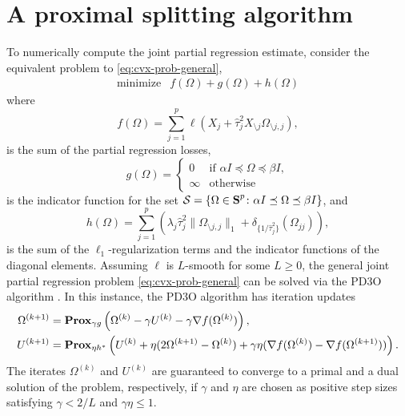 \documentclass{article}
\begin{document}
\section{A proximal splitting algorithm}\label{sec:algorithm}

To numerically compute the joint partial regression estimate, consider the
equivalent problem to \eqref{eq:cvx-prob-general}, 
\[
    \begin{array}{ll}
        \text{minimize} & \displaystyle f(\Omega) + g(\Omega) + h(\Omega)
    \end{array}
\]
where
\[
    f(\Omega) = \sum_{j=1}^{p} \ell(X_j + \hat\tau_j^2X_{\setminus j} \Omega_{\setminus j , j}),
\]
is the sum of the partial regression losses,
\[
    g(\Omega) = \begin{cases}
        0 & \text{if } \alpha I \preceq \Omega \preceq \beta I, \\
        \infty & \text{otherwise}
    \end{cases}
\]
is the indicator function for the set $\mathcal{S} = \{\Omega \in \mbox{\bf S}^p \colon
\alpha I \preceq \Omega \preceq \beta I \}$, and
\[ 
    h(\Omega) = \sum_{j=1}^{p} \left(\lambda_j \hat\tau_j^2 \|\Omega_{\setminus j, j}\|_1 + \delta_{\{1/\hat\tau_j^2\}}(\Omega_{jj}) \right), %
\]
is the sum of the $\ell_1$-regularization terms and the indicator functions of
the diagonal elements. Assuming $\ell$ is $L$-smooth for some $L\geq 0$, the
general joint partial regression problem \eqref{eq:cvx-prob-general} can be
solved via the PD3O algorithm \citep{Yan18}. In this instance, the PD3O
algorithm has iteration updates 
\[
    \begin{aligned}
        \Omega^{(k+1)} &= \mathbf{Prox}_{\gamma g}\left(\Omega^{(k)} - \gamma U^{(k)} - \gamma \nabla f(\Omega^{(k)}) \right), \\
            U^{(k+1)} &= \mathbf{Prox}_{\eta h^*}\left(U^{(k)} + \eta (2 \Omega^{(k+1)} - \Omega^{(k)}) + \gamma \eta (\nabla f(\Omega^{(k)}) - \nabla f(\Omega^{(k+1)})) \right).
    \end{aligned}
\]
The iterates $\Omega^{(k)}$ and $U^{(k)}$ are guaranteed to converge to a primal
and a dual solution of the problem, respectively, if $\gamma$ and $\eta$ are
chosen as positive step sizes satisfying $\gamma < 2 / L$ and $\gamma \eta \leq
1$.
\end{document}

